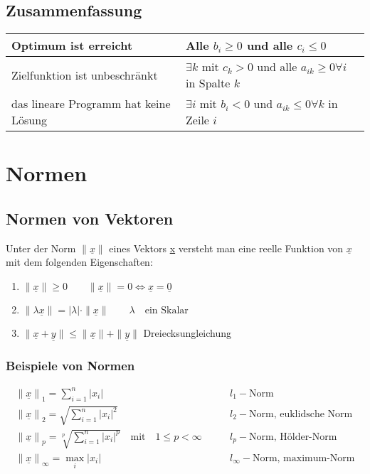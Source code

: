 \subsection{Zusammenfassung}
\begin{center}
\begin{tabular}{| p{3cm} | p{9cm} |}
\hline
  Optimum ist erreicht & Alle $b_i \geq 0$ und alle $c_i \leq 0$ \\
\hline
  Zielfunktion ist unbeschr\"ankt & $\exists k$ mit $c_k > 0$ und alle $a_{ik} \geq 0 \forall i$ in Spalte $k$ \\
\hline
  das lineare Programm hat keine L\"osung & $\exists i$ mit $b_i < 0$ und $a_{ik} \leq 0 \forall k$ in Zeile $i$ \\
\hline
\end{tabular}
\end{center}

\section{Normen}

\subsection{Normen von Vektoren}
Unter der Norm $\|\underline{x}\|$ eines Vektors \underline{x} versteht man eine reelle Funktion von $\underline{x}$ mit dem folgenden Eigenschaften:
\begin{enumerate}
  \item $\|\underline{x}\| \geq 0 \qquad \|\underline{x}\| = 0 \Leftrightarrow \underline{x}=\underline{0}$
  \item $\|\lambda\underline{x}\| = |\lambda|\cdot\|\underline{x}\| \qquad\lambda\quad\text{ein Skalar}$
  \item $\|\underline{x}+\underline{y}\| \leq \|\underline{x}\|+\|\underline{y}\|$ Dreiecksungleichung
\end{enumerate}

\subsubsection{Beispiele von Normen}
\begin{align}
  {\|\underline{x}\|}_1 = \sum_{i=1}^n |x_i| \qquad & l_1 -\text{Norm} \\
  {\|\underline{x}\|}_2 = \sqrt{\sum_{i=1}^n |x_i|^2} \qquad & l_2 -\text{Norm, euklidsche Norm} \\
  {\|\underline{x}\|}_p = \sqrt[p]{\sum_{i=1}^n |x_i|^p} \quad\text{mit}\quad 1\leq p < \infty\qquad & l_p -\text{Norm, H\"older-Norm} \\
  {\|\underline{x}\|}_\infty = \max_i |x_i| \qquad & l_\infty -\text{Norm, maximum-Norm} \\
\end{align}

